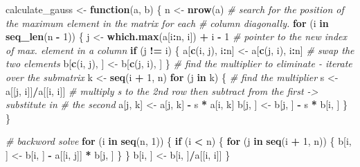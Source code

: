 \documentclass[]{article}
\newenvironment{Shaded}{\begin{snugshade}}{\end{snugshade}}
\newcommand{\CommentTok}[1]{\textcolor[rgb]{0.56,0.35,0.01}{\textit{#1}}}
\newcommand{\ControlFlowTok}[1]{\textcolor[rgb]{0.13,0.29,0.53}{\textbf{#1}}}
\newcommand{\DecValTok}[1]{\textcolor[rgb]{0.00,0.00,0.81}{#1}}
\newcommand{\KeywordTok}[1]{\textcolor[rgb]{0.13,0.29,0.53}{\textbf{#1}}}
\newcommand{\NormalTok}[1]{#1}
\newcommand{\OperatorTok}[1]{\textcolor[rgb]{0.81,0.36,0.00}{\textbf{#1}}}
\newcommand{\StringTok}[1]{\textcolor[rgb]{0.31,0.60,0.02}{#1}}
\begin{document}
\begin{Shaded}
\begin{Highlighting}[]
\NormalTok{calculate_gauss <-}\StringTok{ }\ControlFlowTok{function}\NormalTok{(a, b) \{}
\NormalTok{    n <-}\StringTok{ }\KeywordTok{nrow}\NormalTok{(a)}
    \CommentTok{# search for the position of the maximum element in the matrix for each}
    \CommentTok{# column diagonally.}
    \ControlFlowTok{for}\NormalTok{ (i }\ControlFlowTok{in} \KeywordTok{seq_len}\NormalTok{(n }\OperatorTok{-}\StringTok{ }\DecValTok{1}\NormalTok{)) \{}
\NormalTok{        j <-}\StringTok{ }\KeywordTok{which.max}\NormalTok{(a[i}\OperatorTok{:}\NormalTok{n, i]) }\OperatorTok{+}\StringTok{ }\NormalTok{i }\OperatorTok{-}\StringTok{ }\DecValTok{1}  \CommentTok{# pointer to the new index of max. element in a column}
        \ControlFlowTok{if}\NormalTok{ (j }\OperatorTok{!=}\StringTok{ }\NormalTok{i) \{}
\NormalTok{            a[}\KeywordTok{c}\NormalTok{(i, j), i}\OperatorTok{:}\NormalTok{n] <-}\StringTok{ }\NormalTok{a[}\KeywordTok{c}\NormalTok{(j, i), i}\OperatorTok{:}\NormalTok{n]}
            \CommentTok{# swap the two elements}
\NormalTok{            b[}\KeywordTok{c}\NormalTok{(i, j), ] <-}\StringTok{ }\NormalTok{b[}\KeywordTok{c}\NormalTok{(j, i), ]}
\NormalTok{        \}}
        \CommentTok{# find the multiplier to eliminate - iterate over the submatrix}
\NormalTok{        k <-}\StringTok{ }\KeywordTok{seq}\NormalTok{(i }\OperatorTok{+}\StringTok{ }\DecValTok{1}\NormalTok{, n)}
        \ControlFlowTok{for}\NormalTok{ (j }\ControlFlowTok{in}\NormalTok{ k) \{}
            \CommentTok{# find the multiplier}
\NormalTok{            s <-}\StringTok{ }\NormalTok{a[[j, i]]}\OperatorTok{/}\NormalTok{a[[i, i]]}
            \CommentTok{# multiply s to the 2nd row then subtract from the first -> substitute in}
            \CommentTok{# the second}
\NormalTok{            a[j, k] <-}\StringTok{ }\NormalTok{a[j, k] }\OperatorTok{-}\StringTok{ }\NormalTok{s }\OperatorTok{*}\StringTok{ }\NormalTok{a[i, k]}
\NormalTok{            b[j, ] <-}\StringTok{ }\NormalTok{b[j, ] }\OperatorTok{-}\StringTok{ }\NormalTok{s }\OperatorTok{*}\StringTok{ }\NormalTok{b[i, ]}
\NormalTok{        \}}
\NormalTok{    \}}
    
    \CommentTok{# backword solve}
    \ControlFlowTok{for}\NormalTok{ (i }\ControlFlowTok{in} \KeywordTok{seq}\NormalTok{(n, }\DecValTok{1}\NormalTok{)) \{}
        \ControlFlowTok{if}\NormalTok{ (i }\OperatorTok{<}\StringTok{ }\NormalTok{n) \{}
            \ControlFlowTok{for}\NormalTok{ (j }\ControlFlowTok{in} \KeywordTok{seq}\NormalTok{(i }\OperatorTok{+}\StringTok{ }\DecValTok{1}\NormalTok{, n)) \{}
\NormalTok{                b[i, ] <-}\StringTok{ }\NormalTok{b[i, ] }\OperatorTok{-}\StringTok{ }\NormalTok{a[[i, j]] }\OperatorTok{*}\StringTok{ }\NormalTok{b[j, ]}
\NormalTok{            \}}
\NormalTok{        \}}
\NormalTok{        b[i, ] <-}\StringTok{ }\NormalTok{b[i, ]}\OperatorTok{/}\NormalTok{a[[i, i]]}
\NormalTok{    \}}
    

\end{Highlighting}
\end{Shaded}
\end{document}
